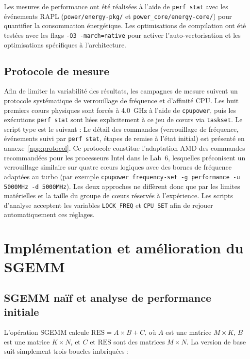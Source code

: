 \documentclass[a4paper,11pt]{article}
\begin{document}
Les mesures de performance ont été réalisées à l'aide de \texttt{perf stat} avec les événements RAPL (\texttt{power/energy-pkg/} et \texttt{power\_core/energy-core/}) pour quantifier la consommation énergétique. Les optimisations de compilation ont été testées avec les flags \texttt{-O3 -march=native} pour activer l'auto-vectorisation et les optimisations spécifiques à l'architecture.

\subsection{Protocole de mesure}\label{subsec:protocol}

Afin de limiter la variabilité des résultats, les campagnes de mesure suivent un protocole systématique de verrouillage de fréquence et d'affinité CPU. Les huit premiers cœurs physiques sont forcés à 4.0~GHz à l'aide de \texttt{cpupower}, puis les exécutions \texttt{perf stat} sont liées explicitement à ce jeu de cœurs via \texttt{taskset}. Le script type est le suivant :
Le détail des commandes (verrouillage de fréquence, événements suivi par \texttt{perf stat}, étapes de remise à l'état initial) est présenté en annexe~\ref{app:protocol}. Ce protocole constitue l'adaptation AMD des commandes recommandées pour les processeurs Intel dans le Lab~6, lesquelles préconisent un verrouillage similaire sur quatre cœurs logiques avec des bornes de fréquence adaptées au turbo (par exemple \texttt{cpupower frequency-set -g performance -u 5000MHz -d 5000MHz}). Les deux approches ne diffèrent donc que par les limites matérielles et la taille du groupe de cœurs réservés à l'expérience. Les scripts d'analyse acceptent les variables \texttt{LOCK\_FREQ} et \texttt{CPU\_SET} afin de rejouer automatiquement ces réglages.

\section{Implémentation et amélioration du SGEMM}\label{sec:sgemm}

\subsection{SGEMM naïf et analyse de performance initiale}\label{subsec:sgemm-naif}

L'opération SGEMM calcule $\text{RES} = A \times B + C$, où $A$ est une matrice $M \times K$, $B$ est une matrice $K \times N$, et $C$ et $\text{RES}$ sont des matrices $M \times N$. La version de base suit simplement trois boucles imbriquées :
\end{document}

